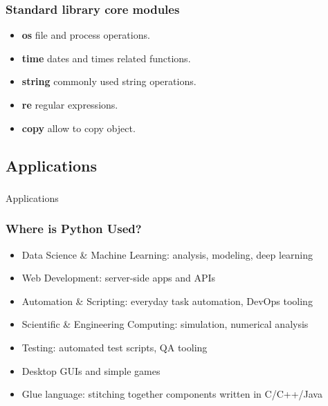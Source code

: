 \begin{frame}[fragile]\frametitle{Standard library core modules}
  \begin{itemize}
  \item \textbf{os} file and process operations.
  \item \textbf{time} dates and times related functions.
  \item \textbf{string} commonly used string operations.
  \item \textbf{re} regular expressions.
  \item \textbf{copy} allow to copy object.
  \end{itemize}
\end{frame}

\subsection{Applications}
\begin{frame}[fragile]\frametitle{}
\begin{center}
{\Large Applications}
\end{center}
\end{frame}

\begin{frame}[fragile]\frametitle{Where is Python Used?}
\begin{itemize}
\item Data Science \& Machine Learning: analysis, modeling, deep learning
\item Web Development: server-side apps and APIs
\item Automation \& Scripting: everyday task automation, DevOps tooling
\item Scientific \& Engineering Computing: simulation, numerical analysis
\item Testing: automated test scripts, QA tooling
\item Desktop GUIs and simple games
\item Glue language: stitching together components written in C/C++/Java
\end{itemize}
\end{frame}

